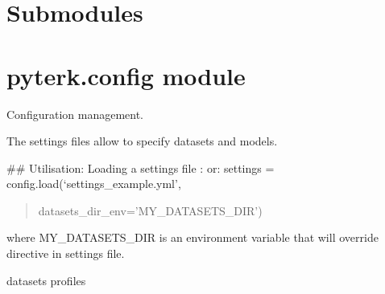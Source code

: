 \documentclass[letterpaper,10pt,english]{sphinxmanual}
\begin{document}
\section{Submodules}
\label{\detokenize{pyterk:submodules}}

\section{pyterk.config module}
\label{\detokenize{pyterk:module-pyterk.config}}\label{\detokenize{pyterk:pyterk-config-module}}
\sphinxAtStartPar
Configuration management.

\sphinxAtStartPar
The settings files allow to specify datasets and models.

\sphinxAtStartPar
\#\# Utilisation:
Loading a settings file :
or:
{\color{red}\bfseries{}\textasciigrave{}\textasciigrave{}}\textasciigrave{}
settings = config.load(‘settings\_example.yml’,
\begin{quote}

\sphinxAtStartPar
datasets\_dir\_env=’MY\_DATASETS\_DIR’)
\end{quote}

\sphinxAtStartPar
{\color{red}\bfseries{}\textasciigrave{}\textasciigrave{}}{\color{red}\bfseries{}\textasciigrave{}}

\sphinxAtStartPar
where MY\_DATASETS\_DIR is an environment variable that will override 
directive in settings file.

\begin{fulllineitems}
\label{\detokenize{pyterk:pyterk.config.datasets}}
\sphinxAtStartPar
datasets profiles

\end{fulllineitems}

\end{document}
